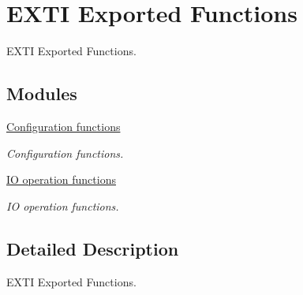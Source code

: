 \hypertarget{group___e_x_t_i___exported___functions}{}\section{E\+X\+TI Exported Functions}
\label{group___e_x_t_i___exported___functions}


E\+X\+TI Exported Functions.  


\subsection*{Modules}
\begin{DoxyCompactItemize}
\item 
\hyperlink{group___e_x_t_i___exported___functions___group1}{Configuration functions}
\begin{DoxyCompactList}\small\item\em Configuration functions. \end{DoxyCompactList}\item 
\hyperlink{group___e_x_t_i___exported___functions___group2}{I\+O operation functions}
\begin{DoxyCompactList}\small\item\em IO operation functions. \end{DoxyCompactList}\end{DoxyCompactItemize}


\subsection{Detailed Description}
E\+X\+TI Exported Functions. 

